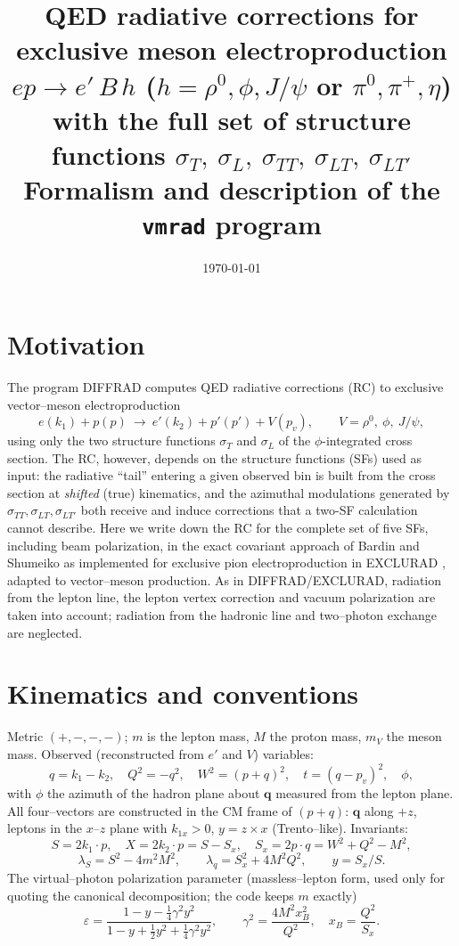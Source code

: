 \documentclass[11pt]{article}
\title{QED radiative corrections for exclusive meson electroproduction
$ep\to e'\,B\,h$ ($h=\rho^0,\phi,J/\psi$ or $\pi^0,\pi^+,\eta$) with the
full set of structure functions
$\sigma_T,\ \sigma_L,\ \sigma_{TT},\ \sigma_{LT},\ \sigma_{LT'}$\\[2mm]
\large Formalism and description of the \texttt{vmrad} program}
\author{}
\date{\today}
\begin{document}
\maketitle

\section{Motivation}

The program DIFFRAD \cite{diffrad} computes QED radiative corrections (RC)
to exclusive vector--meson electroproduction
\begin{equation}
e(k_1)+p(p)\ \longrightarrow\ e'(k_2)+p'(p')+V(p_v),
\qquad V=\rho^0,\ \phi,\ J/\psi ,
\end{equation}
using only the two structure functions $\sigma_T$ and $\sigma_L$ of the
$\phi$-integrated cross section. The RC, however, depends on the structure
functions (SFs) used as input: the radiative ``tail'' entering a given
observed bin is built from the cross section at \emph{shifted} (true)
kinematics, and the azimuthal modulations generated by
$\sigma_{TT},\sigma_{LT},\sigma_{LT'}$ both receive and induce corrections
that a two-SF calculation cannot describe. Here we write down the RC for the
complete set of five SFs, including beam polarization, in the exact
covariant approach of Bardin and Shumeiko \cite{bs} as implemented for
exclusive pion electroproduction in EXCLURAD \cite{exclurad}, adapted to
vector--meson production. As in DIFFRAD/EXCLURAD, radiation from the lepton
line, the lepton vertex correction and vacuum polarization are taken into
account; radiation from the hadronic line and two--photon exchange are
neglected.

\section{Kinematics and conventions}

Metric $(+,-,-,-)$; $m$ is the lepton mass, $M$ the proton mass, $m_V$ the
meson mass. Observed (reconstructed from $e'$ and $V$) variables:
\begin{equation}
q=k_1-k_2,\quad Q^2=-q^2,\quad W^2=(p+q)^2,\quad t=(q-p_v)^2,\quad \phi,
\end{equation}
with $\phi$ the azimuth of the hadron plane about $\bm q$ measured from the
lepton plane. All four--vectors are constructed in the CM frame of $(p+q)$:
$\bm q$ along $+z$, leptons in the $x$--$z$ plane with $k_{1x}>0$,
$y=z\times x$ (Trento--like). Invariants:
\begin{equation}
S=2k_1\!\cdot\!p,\quad X=2k_2\!\cdot\!p = S-S_x,\quad S_x=2p\!\cdot\!q=W^2+Q^2-M^2,
\end{equation}
\begin{equation}
\lambda_S=S^2-4m^2M^2,\qquad
\lambda_q=S_x^2+4M^2Q^2,\qquad y=S_x/S .
\end{equation}
The virtual--photon polarization parameter (massless--lepton form, used only
for quoting the canonical decomposition; the code keeps $m$ exactly)
\begin{equation}
\varepsilon=\frac{1-y-\tfrac14\gamma^2y^2}{1-y+\tfrac12 y^2+\tfrac14\gamma^2y^2},
\qquad \gamma^2=\frac{4M^2x_B^2}{Q^2},\quad x_B=\frac{Q^2}{S_x}.
\end{equation}
\end{document}
